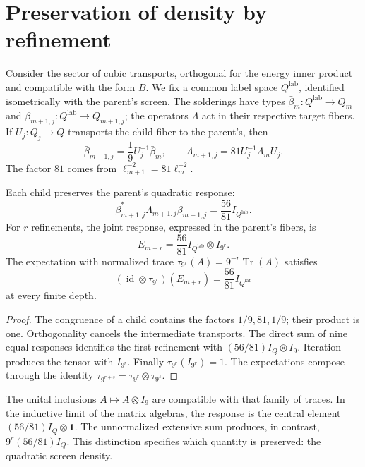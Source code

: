 \section{Preservation of density by refinement}
\label{x_reciprocidad:vii:sec:densidad-refinamiento}

Consider the sector of cubic transports, orthogonal for the energy
inner product and compatible with the form \(B\). We fix a
common label space \(Q^{\mathrm{lab}}\), identified
isometrically with the parent's screen. The solderings have
types
\(\bar\beta_m:Q^{\mathrm{lab}}\longrightarrow Q_m\) and
\(\bar\beta_{m+1,j}:Q^{\mathrm{lab}}\longrightarrow Q_{m+1,j}\);
the operators \(\Lambda\) act in their respective target fibers.
If
\(U_j:Q_j\longrightarrow Q\) transports the child fiber to the parent's,
then
\[
 \bar\beta_{m+1,j}=\frac19U_j^{-1}\bar\beta_m,\qquad
 \Lambda_{m+1,j}=81U_j^{-1}\Lambda_mU_j.
\]
The factor \(81\) comes from \(\ell_{m+1}^{-2}=81\ell_m^{-2}\).

\begin{theorem}
\label{x_reciprocidad:vii:thm:densidad}
Each child preserves the parent's quadratic response:
\[
 \bar\beta_{m+1,j}^*\Lambda_{m+1,j}\bar\beta_{m+1,j}
 =\frac{56}{81}I_{Q^{\mathrm{lab}}}.
\]
For \(r\) refinements, the joint response, expressed in the parent's
fibers, is
\[
 E_{m+r}=\frac{56}{81}I_{Q^{\mathrm{lab}}}\otimes I_{9^r}.
\]
The expectation with normalized trace
\(\tau_{9^r}(A)=9^{-r}\operatorname{Tr}(A)\) satisfies
\[
 (\operatorname{id}\otimes\tau_{9^r})(E_{m+r})
 =\frac{56}{81}I_{Q^{\mathrm{lab}}}
\]
at every finite depth.
\end{theorem}

\begin{proof}
The congruence of a child contains the factors \(1/9,81,1/9\);
their product is one. Orthogonality cancels the intermediate
transports. The direct sum of nine equal responses identifies
the first refinement with \((56/81)I_Q\otimes I_9\).
Iteration produces the tensor with \(I_{9^r}\).
Finally \(\tau_{9^r}(I_{9^r})=1\). The expectations compose
through the identity
\(\tau_{9^{r+s}}=\tau_{9^r}\otimes\tau_{9^s}\).
\end{proof}

The unital inclusions \(A\mapsto A\otimes I_9\) are compatible with
that family of traces. In the inductive limit of the matrix algebras,
the response is the central element
\((56/81)I_Q\otimes\mathbf1\). The unnormalized extensive sum produces,
in contrast, \(9^r(56/81)I_Q\). This distinction specifies which quantity
is preserved: the quadratic screen density.


